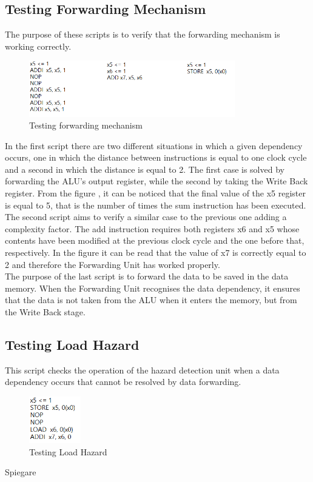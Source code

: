 \subsection{Testing Forwarding Mechanism}
The purpose of these scripts is to verify that the forwarding mechanism is working correctly. 
\begin{figure}[H]
	\centering
	\includegraphics[width=0.8\textwidth]{sec3/images/test456.png}
	\caption{Testing forwarding mechanism}
	\label{fig:test456}
\end{figure}
\noindent In the first script there are two different situations in which a given dependency occurs, one in which the distance between instructions is equal to one clock cycle and a second in which the distance is equal to 2. The first case is solved by forwarding the ALU's output register, while the second by taking the Write Back register. From the figure , it can be noticed that the final value of the x5 register is equal to 5, that is the number of times the sum instruction has been executed.\\
The second script aims to verify a similar case to the previous one adding a complexity factor. The add instruction requires both registers x6 and x5 whose contents have been modified at the previous clock cycle and the one before that, respectively. In the figure  it can be read that the value of x7 is correctly equal to 2 and therefore the Forwarding Unit has worked properly.\\
The purpose of the last script is to forward the data to be saved in the data memory. When the Forwarding Unit recognises the data dependency, it ensures that the data is not taken from the ALU when it enters the memory, but from the Write Back stage.

\subsection{Testing Load Hazard}
This script checks the operation of the hazard detection unit when a data dependency occurs that cannot be resolved by data forwarding.
\begin{figure}[H]
	\centering
	\includegraphics[width=0.2\textwidth]{sec3/images/test7.png}
	\caption{Testing Load Hazard}
	\label{fig:test7}
\end{figure}
\noindent Spiegare